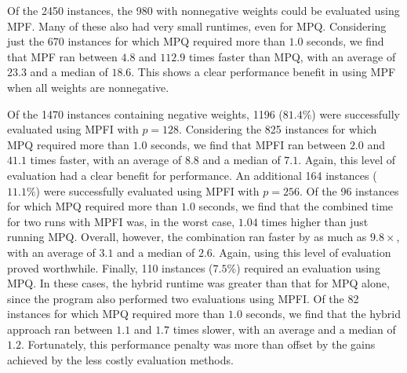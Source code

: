 \documentclass[letterpaper,USenglish,cleveref, autoref, thm-restate]{lipics-v2021}
\begin{document}
Of the 2450 instances, the 980 with nonnegative weights could be evaluated using MPF\@.  Many of these also had very small runtimes, even for MPQ\@.
Considering just the 670 instances for which MPQ required more than $1.0$ seconds, we find that MPF ran between $4.8$ and $112.9$ times faster than MPQ, with an average of $23.3$ and a median of $18.6$.  This shows a clear performance benefit in using MPF when all weights are nonnegative.

Of the 1470 instances containing negative weights, 1196 ($81.4\%$)
were successfully evaluated using MPFI with $p=128$.  Considering the
825 instances for which MPQ required more than $1.0$ seconds, we find
that MPFI ran between $2.0$ and $41.1$ times faster, with an average of
$8.8$ and a median of $7.1$.  Again, this level of evaluation had a
clear benefit for performance.  An additional 164 instances
($11.1\%$) were successfully evaluated using MPFI with $p=256$.  Of
the 96 instances for which MPQ required more than $1.0$ seconds, we
find that the combined time for two runs with MPFI was, in the worst
case, $1.04$ times higher than just running MPQ\@.  Overall, however,
the combination ran faster by as much as $9.8\times$, with an average
of $3.1$ and a median of $2.6$.  Again, using this level of evaluation
proved worthwhile.  Finally, 110 instances ($7.5\%$) required an
evaluation using MPQ\@.  In these cases, the hybrid runtime was
greater than that for MPQ alone, since the program also performed two
evaluations using MPFI\@.  Of the 82 instances for which MPQ required
more than $1.0$ seconds, we find that the hybrid approach ran between
$1.1$ and $1.7$ times slower, with an average and a median of $1.2$.
Fortunately, this performance penalty was more than offset by the gains achieved by the less costly evaluation methods.
\end{document}
